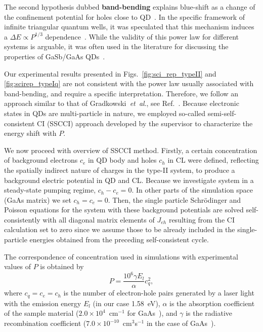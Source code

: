 The second hypothesis dubbed \textbf{band-bending} explains blue-shift as a change of the confinement potential for holes close to QD~\citep{LiuSteer,Jin,Hatami1998,Jo2012}. In the specific framework of infinite triangular quantum wells, it was speculated that this mechanism induces a $\Delta E \propto P^{1/3}$ dependence~\cite{Ledentsov1995,Kuokstis2002,Jo2012}. While the validity of this power law for different systems is arguable, it was often used in the literature for discussing the properties of GaSb/GaAs QDs~\cite{HATAMI1995,Hatami1998}.

Our experimental results presented in Figs.~\ref{fig:sci_rep_typeII} and \ref{fig:scirep_typeIq} are not consistent with the power law usually associated with band-bending, and require a specific interpretation. Therefore, we follow an approach similar to that of Gradkowski\textit{~et~al}., see Ref.~\citep{Gradkowski2012}. Because electronic states in QDs are multi-particle in nature, we employed so-called semi-self-consistent CI (SSCCI) approach developed by the supervisor to characterize the energy shift with $P$.

We now proceed with overview of SSCCI method. Firstly, a certain concentration of background electrons $c_e$ in QD body and holes $c_h$ in CL were defined, reflecting the spatially indirect nature of charges in the type-II system, to produce a background electric potential in QD and CL. Because we investigate system in a steady-state pumping regime, $c_h-c_e=0$. In other parts of the simulation space (GaAs matrix) we set $c_h=c_e=0$. Then, the single particle Schrödinger and Poisson equations for the system with these background potentials are solved self-consistently with all diagonal matrix elements of $J_{eh}$ resulting from the CI calculation set to zero since we assume those to be already included in the single-particle energies obtained from the preceding self-consistent cycle.

The correspondence of concentration used in simulations with experimental values of $P$ is obtained by~\cite{Kuokstis2002}
%
\begin{equation}
\label{eq:conc_to_P_recalc}
P=\frac{10^6\gamma E_{l}}{\alpha}c_q^2,
\end{equation}
where $c_q=c_e=c_h$ is the number of electron-hole pairs generated by a laser light with the emission energy $E_l$ (in our case 1.58~eV), $\alpha$ is the absorption coefficient of the sample material ($2.0\times 10^4$~cm$^{-1}$ for GaAs~\cite{landoltbornstein}), and $\gamma$ is the radiative recombination coefficient ($7.0\times 10^{-10}$~cm$^3$s$^{-1}$ in the case of GaAs~\cite{landoltbornstein}).

